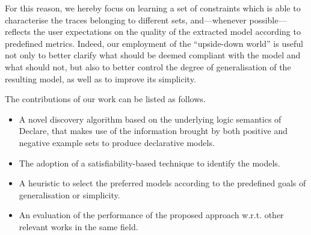 
For this reason, we hereby focus on learning a set of constraints which is able to characterise the traces belonging to different sets, and---whenever possible---reflects the user expectations on the quality of the extracted model according to predefined metrics. 
%
Indeed, our employment of the ``upside-down world'' is useful not only to better clarify what should be deemed compliant with the model and what should not, but also to better control the degree of generalisation of the resulting model, as well as to improve its simplicity.

%



The contributions of our work can be listed as follows.
\begin{itemize}
\item A novel discovery algorithm based on the underlying logic semantics of Declare, that makes use of the information brought by both positive and negative example sets to produce declarative models.
\item The adoption of a satisfiability-based technique to identify the models.
\item A heuristic to select the preferred models according to the predefined goals of generalisation or simplicity.
\item An evaluation of the performance of the proposed approach w.r.t. other relevant works in the same field.
\end{itemize}

